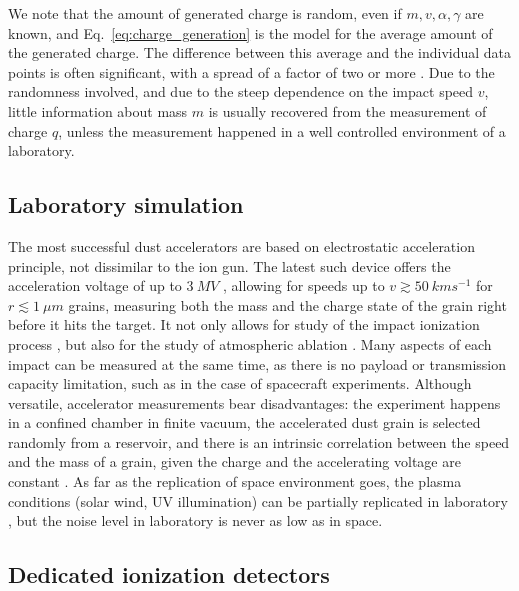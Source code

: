 We note that the amount of generated charge is random, even if $m,v,\alpha,\gamma$ are known, and Eq.~\ref{eq:charge_generation} is the model for the average amount of the generated charge. The difference between this average and the individual data points is often significant, with a spread of a factor of two or more \citep{collette2014micrometeoroid,shen2021cosmic}. Due to the randomness involved, and due to the steep dependence on the impact speed $v$, little information about mass $m$ is usually recovered from the measurement of charge $q$, unless the measurement happened in a well controlled environment of a laboratory.

\subsection{Laboratory simulation}

The most successful dust accelerators are based on electrostatic acceleration principle, not dissimilar to the ion gun. The latest such device offers the acceleration voltage of up to $\SI{3}{MV}$ \citep{shu20123}, allowing for speeds up to $v\gtrsim \SI{50}{kms^{-1}}$ for $r\lesssim\SI{1}{\mu m}$ grains, measuring both the mass and the charge state of the grain right before it hits the target. It not only allows for study of the impact ionization process \citep{shen2021electrostatic,shen2021laboratory,shen2023variability,nouzak2018laboratory,nouzak2021detection,kovcivsvcak2020effective,collette2014micrometeoroid}, but also for the study of atmospheric ablation \citep{thomas2017experimental,deluca2018ionization,deluca2022differential,tarnecki2023experimentally}. Many aspects of each impact can be measured at the same time, as there is no payload or transmission capacity limitation, such as in the case of spacecraft experiments. Although versatile, accelerator measurements bear disadvantages: the experiment happens in a confined chamber in finite vacuum, the accelerated dust grain is selected randomly from a reservoir, and there is an intrinsic correlation between the speed and the mass of a grain, given the charge and the accelerating voltage are constant \citep{shelton1960electrostatic}. As far as the replication of space environment goes, the plasma conditions (solar wind, UV illumination) can be partially replicated in laboratory \citep{shu20123,horanyi2008surface}, but the noise level in laboratory is never as low as in space. 

\subsection{Dedicated ionization detectors}

